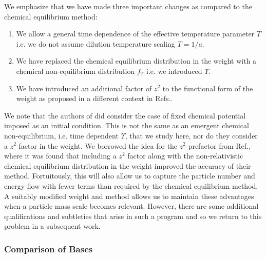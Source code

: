 We emphasize that we have made three important changes as compared to  the chemical equilibrium method:
\begin{enumerate}
\item  We allow a general time dependence of the effective temperature parameter $T$ i.e. we do not assume dilution temperature scaling $T=1/a$.
\item We have replaced the chemical  equilibrium distribution in the weight   with a chemical non-equilibrium distribution  $f_\Upsilon $ i.e. we introduced $\Upsilon$.
\item We have introduced an additional factor of $z^2$ to the functional form of the weight as proposed in a different context in Refs.\cite{Wilkening,Wilkening2}. 
\end{enumerate} 
We note that the authors of \cite{Esposito2000} did consider the case of fixed chemical potential imposed as an initial condition. This is not the same as an emergent chemical non-equilibrium, i.e. time dependent $\Upsilon$, that we study here, nor do they consider a $z^2$ factor in the weight. We borrowed the idea for the $z^2$ prefactor from   Ref.\cite{Wilkening2}, where it was found that including a $z^2$ factor along with the non-relativistic chemical equilibrium distribution in the weight improved the accuracy of their method. Fortuitously,  this will also allow us to capture the particle number and energy flow with fewer terms than required by the chemical equilibrium method. A suitably modified weight and method allows us to maintain  these advantages when a particle mass scale becomes relevant. However, there are some additional qualifications and subtleties that arise in such a program and so we return to this problem in a subsequent work.

\subsubsection{Comparison of Bases}\label{basis_comparison}

